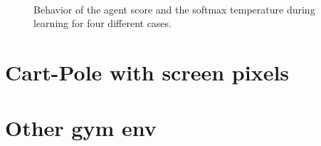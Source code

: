 \documentclass[a4paper, 11pt]{article}
\begin{document}
  \begin{figure}
    \centering
     \quad
     \\
     \quad
    \caption{Behavior of the agent score and the softmax temperature during learning for four different cases.}
    \label{fig:scores}
  \end{figure}





\section{Cart-Pole with screen pixels}

\section{Other gym env}
\end{document}
